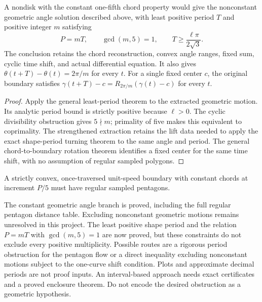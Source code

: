 \begin{proposition}
\label{prop:least-pentagon-period}
\leanok
{}
A nondisk with the constant one-fifth chord property would give the
nonconstant geometric angle solution described above, with least positive
period $T$ and positive integer $m$ satisfying
\[
 P=mT,\qquad \gcd(m,5)=1,\qquad
 T\geq\frac{\ell\pi}{2\sqrt3}.
\]
The conclusion retains the chord reconstruction, convex angle ranges,
fixed sum, cyclic time shift, and actual differential equation.
It also gives $\theta(t+T)-\theta(t)=2\pi/m$ for every $t$.
For a single fixed center $c$, the original boundary satisfies
$\gamma(t+T)-c=R_{2\pi/m}(\gamma(t)-c)$ for every $t$.
\end{proposition}
\begin{proof}
\leanok
Apply the general least-period theorem to the extracted geometric motion.
Its analytic period bound is strictly positive because $\ell>0$.
The cyclic divisibility obstruction gives $5\nmid m$; primality of five
makes this equivalent to coprimality.
The strengthened extraction retains the lift data needed to apply the
exact shape-period turning theorem to the same angle and period.
The general chord-to-boundary rotation theorem identifies a fixed center
for the same time shift, with no assumption of regular sampled polygons.
\end{proof}

\begin{proposition}
\label{prop:pentagon}
\notready
{}
A strictly convex, once-traversed unit-speed boundary with constant chords
at increment $P/5$ must have regular sampled pentagons.
\end{proposition}
The constant geometric angle branch is proved, including the full regular
pentagon distance table. Excluding nonconstant geometric motions remains
unresolved in this project. The least positive shape period and the relation
$P=mT$ with $\gcd(m,5)=1$ are now proved, but these constraints do not
exclude every positive multiplicity. Possible
routes are a rigorous period obstruction for the pentagon flow or a direct
inequality excluding nonconstant motions subject to the one-curve shift
condition. Plots and approximate decimal periods are not proof inputs.
An interval-based approach needs exact certificates and a proved enclosure
theorem. Do not encode the desired obstruction as a geometric hypothesis.

